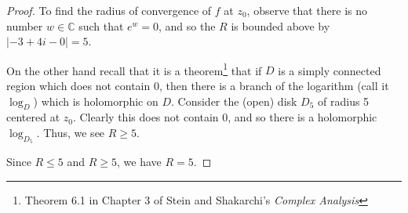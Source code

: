 \documentclass{article}
\begin{document}
\begin{enumerate}
\begin{proof}
		To find the radius of convergence of $f$ at $z_0$, observe that there is no number $w \in \mathbb{C}$ such that $e^w = 0$, and so the $R$ is bounded above by $|-3 + 4i - 0| = 5$.		
		
		On the other hand recall that it is a theorem\footnote{Theorem 6.1 in Chapter 3 of Stein and Shakarchi's \textit{Complex Analysis}} that if $D$ is a simply connected region which does not contain $0$, then there is a branch of the logarithm (call it $\log_D$) which is holomorphic on $D$. Consider the (open) disk $D_5$ of radius 5 centered at $z_0$. Clearly this does not contain $0$, and so there is a holomorphic $\log_{D_5}$. Thus, we see $R \geq 5$. 
		
		Since $R \leq 5$ and $R \geq 5$, we have $R = 5$.
	\end{proof}

\end{enumerate}
\end{document}
